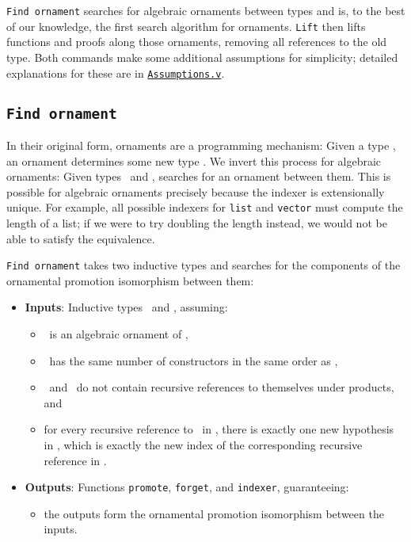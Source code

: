 \lstinline{Find ornament} searches for algebraic ornaments between types and is, to the best of our knowledge, the first search algorithm
for ornaments. \lstinline{Lift} then lifts functions and proofs along those ornaments, removing all references to the old type.
Both commands make some additional assumptions for simplicity; detailed explanations for these are
in \href{http://github.com/uwplse/ornamental-search/blob/itp+equiv/plugin/coq/examples/Assumptions.v}{\lstinline{Assumptions.v}}.

\subsection{\lstinline{Find ornament}}
\label{sec:findspec}

In their original form, ornaments are a programming mechanism: Given a type \Aa, an ornament determines
some new type \B. We invert this process for algebraic ornaments: Given types \Aa\ and \B, 
\toolnameb searches for an ornament between them. This is possible for algebraic ornaments precisely because the indexer is extensionally unique.
For example, all possible indexers for \lstinline{list} and \lstinline{vector} must compute
the length of a list; if we were to try doubling the length instead, we would not be able to satisfy the equivalence.

\lstinline{Find ornament} takes two inductive types and searches for the components of the 
ornamental promotion isomorphism between them:

\begin{itemize}
\item \textbf{Inputs}: Inductive types \Aa\ and \B, assuming:
\begin{itemize}
\item \B\ is an algebraic ornament of \Aa,
\item \B\ has the same number of constructors in the same order as \Aa,
\item \Aa\ and \B\ do not contain recursive references to themselves under products, and
\item for every recursive reference to \Aa\ in \Aa, there is exactly one new hypothesis in \B, which is exactly the new index of the corresponding recursive reference in \B.
\end{itemize}
\item \textbf{Outputs}: Functions \lstinline{promote}, \lstinline{forget}, and \lstinline{indexer}, guaranteeing:
\begin{itemize}
\item the outputs form the ornamental promotion isomorphism between the inputs.
\end{itemize}
\end{itemize}

